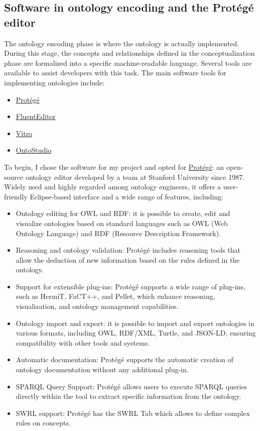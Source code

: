 \subsection{Software in ontology encoding and the Protégé editor}
The ontology encoding phase is where the ontology is actually implemented. During this stage, the concepts and relationships defined in the conceptualization phase are formalized into a specific machine-readable language. Several tools are available to assist developers with this task. The main software tools for implementing ontologies include:
\begin{itemize}
    \item \href{https://protege.stanford.edu/}{Protégé}
    \item \href{https://www.cognitum.eu/semantics/fluenteditor/}{FluentEditor}
    \item \href{https://github.com/vivo-project/Vitro?tab=readme-ov-file}{Vitro}
    \item \href{https://www.semafora-systems.com/ontobroker-and-ontostudio-x}{OntoStudio}
\end{itemize}
To begin, I chose the software for my project and opted for \href{https://protege.stanford.edu/}{Protégé}: an open-source ontology editor developed by a team at Stanford University since 1987. Widely used and highly regarded among ontology engineers, it offers a user-friendly Eclipse-based interface and a wide range of features, including:
\begin{itemize}
    \item Ontology editing for OWL and RDF: it is possible to create, edit and visualize ontologies based on standard languages such as OWL (Web Ontology Language) and RDF (Resource Description Framework). 
    
    \item Reasoning and ontology validation: Protégé includes reasoning tools that allow the deduction of new information based on the rules defined in the ontology.

    \item Support for extensible plug-ins: Protégé supports a wide range of plug-ins, such as HermiT, FaCT++, and Pellet, which enhance reasoning, visualization, and ontology management capabilities.

    \item Ontology import and export: it is possible to import and export ontologies in various formats, including OWL, RDF/XML, Turtle, and JSON-LD, ensuring  compatibility with other tools and systems.

    \item Automatic documentation: Protégé supports the automatic creation of ontology documentation without any additional plug-in.

    \item SPARQL Query Support: Protégé allows users to execute SPARQL queries directly within the tool to extract specific information from the ontology.

    \item SWRL support: Protégé has the SWRL Tab which allows to define complex rules on concepts.
\end{itemize}
